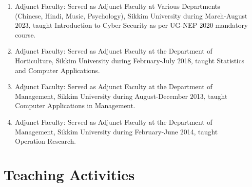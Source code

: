 \documentclass[11pt,a4paper]{moderncv}
\begin{document}
\begin{adjustwidth}{6em}{0pt}
	\begin{enumerate}
		\item Adjunct Faculty: Served as Adjunct Faculty at Various Departments (Chinese, Hindi, Music, Psychology), Sikkim University during March-August 2023, taught Introduction to Cyber Security as per UG-NEP 2020 mandatory course.
		
		\item Adjunct Faculty: Served as Adjunct Faculty at the Department of Horticulture, Sikkim University during February-July 2018, taught Statistics and Computer Applications.
		
		\item Adjunct Faculty: Served as Adjunct Faculty at the Department of Management, Sikkim University during August-December 2013, taught Computer Applications in Management.
		
		\item Adjunct Faculty: Served as Adjunct Faculty at the Department of Management, Sikkim University during February-June 2014, taught Operation Research.
		
	\end{enumerate}
\end{adjustwidth}


\vspace{1cm}

\section{\textbf{Teaching Activities}}
\end{document}
